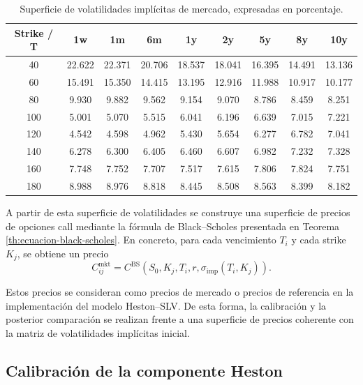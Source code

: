 \begin{table}[H]
\centering
\small
\begin{tabular}{c|cccccccc}
\hline
\textbf{Strike / T} & \textbf{1w} & \textbf{1m} & \textbf{6m} & \textbf{1y} & \textbf{2y} & \textbf{5y} & \textbf{8y} & \textbf{10y} \\
\hline
40  & 22.622 & 22.371 & 20.706 & 18.537 & 18.041 & 16.395 & 14.491 & 13.136 \\
60  & 15.491 & 15.350 & 14.415 & 13.195 & 12.916 & 11.988 & 10.917 & 10.177 \\
80  & 9.930  & 9.882  & 9.562  & 9.154  & 9.070  & 8.786  & 8.459  & 8.251  \\
100 & 5.001  & 5.070  & 5.515  & 6.041  & 6.196  & 6.639  & 7.015  & 7.221  \\
120 & 4.542  & 4.598  & 4.962  & 5.430  & 5.654  & 6.277  & 6.782  & 7.041  \\
140 & 6.278  & 6.300  & 6.405  & 6.460  & 6.607  & 6.982  & 7.232  & 7.328  \\
160 & 7.748  & 7.752  & 7.707  & 7.517  & 7.615  & 7.806  & 7.824  & 7.751  \\
180 & 8.988  & 8.976  & 8.818  & 8.445  & 8.508  & 8.563  & 8.399  & 8.182  \\
\hline
\end{tabular}
\caption{Superficie de volatilidades implícitas de mercado, expresadas en porcentaje.}
\label{tab:volatilidades_implicitas_mercado}
\end{table}

A partir de esta superficie de volatilidades se construye una superficie de precios de opciones call mediante la fórmula de Black--Scholes presentada en Teorema \ref{th:ecuacion-black-scholes}. En concreto, para cada vencimiento $T_i$ y cada strike $K_j$, se obtiene un precio
\[
    C_{ij}^{\mathrm{mkt}}
    =
    C^{\mathrm{BS}}
    \left(
        S_0,K_j,T_i,r,\sigma_{\mathrm{imp}}(T_i,K_j)
    \right).
\]

Estos precios se consideran como precios de mercado o precios de referencia en la implementación del modelo Heston--SLV. De esta forma, la calibración y la posterior comparación se realizan frente a una superficie de precios coherente con la matriz de volatilidades implícitas inicial.

\subsection{Calibración de la componente Heston}

